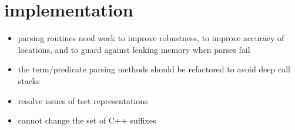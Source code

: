 \section{\acslpp implementation}

\begin{itemize}
\item parsing routines need work to improve robustness, to improve accuracy of locations, and to guard against leaking memory when parses fail
\item the term/predicate parsing methods should be refactored to avoid deep call stacks
\item resolve issues of tset representations
\item cannot change the set of C++ suffixes
\end{itemize}




